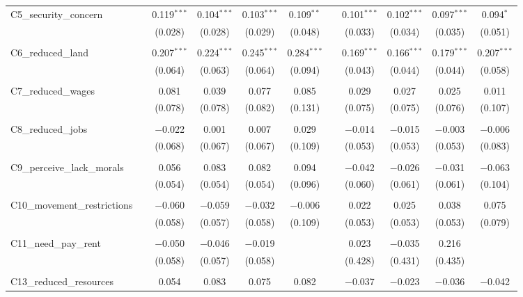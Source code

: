 \begin{table}[H]
\begin{tabular}{@{\extracolsep{4pt}}lcccccccccc}
 C5\_security\_concern &  & 0.119$^{***}$ & 0.104$^{***}$ & 0.103$^{***}$ & 0.109$^{**}$ &  & 0.101$^{***}$ & 0.102$^{***}$ & 0.097$^{***}$ & 0.094$^{*}$ \\ 
  &  & (0.028) & (0.028) & (0.029) & (0.048) &  & (0.033) & (0.034) & (0.035) & (0.051) \\ 
  & & & & & & & & & & \\ 
 C6\_reduced\_land &  & 0.207$^{***}$ & 0.224$^{***}$ & 0.245$^{***}$ & 0.284$^{***}$ &  & 0.169$^{***}$ & 0.166$^{***}$ & 0.179$^{***}$ & 0.207$^{***}$ \\ 
  &  & (0.064) & (0.063) & (0.064) & (0.094) &  & (0.043) & (0.044) & (0.044) & (0.058) \\ 
  & & & & & & & & & & \\ 
 C7\_reduced\_wages &  & 0.081 & 0.039 & 0.077 & 0.085 &  & 0.029 & 0.027 & 0.025 & 0.011 \\ 
  &  & (0.078) & (0.078) & (0.082) & (0.131) &  & (0.075) & (0.075) & (0.076) & (0.107) \\ 
  & & & & & & & & & & \\ 
 C8\_reduced\_jobs &  & $-$0.022 & 0.001 & 0.007 & 0.029 &  & $-$0.014 & $-$0.015 & $-$0.003 & $-$0.006 \\ 
  &  & (0.068) & (0.067) & (0.067) & (0.109) &  & (0.053) & (0.053) & (0.053) & (0.083) \\ 
  & & & & & & & & & & \\ 
 C9\_perceive\_lack\_morals &  & 0.056 & 0.083 & 0.082 & 0.094 &  & $-$0.042 & $-$0.026 & $-$0.031 & $-$0.063 \\ 
  &  & (0.054) & (0.054) & (0.054) & (0.096) &  & (0.060) & (0.061) & (0.061) & (0.104) \\ 
  & & & & & & & & & & \\ 
 C10\_movement\_restrictions &  & $-$0.060 & $-$0.059 & $-$0.032 & $-$0.006 &  & 0.022 & 0.025 & 0.038 & 0.075 \\ 
  &  & (0.058) & (0.057) & (0.058) & (0.109) &  & (0.053) & (0.053) & (0.053) & (0.079) \\ 
  & & & & & & & & & & \\ 
 C11\_need\_pay\_rent &  & $-$0.050 & $-$0.046 & $-$0.019 &  &  & 0.023 & $-$0.035 & 0.216 &  \\ 
  &  & (0.058) & (0.057) & (0.058) &  &  & (0.428) & (0.431) & (0.435) &  \\ 
  & & & & & & & & & & \\ 
 C13\_reduced\_resources &  & 0.054 & 0.083 & 0.075 & 0.082 &  & $-$0.037 & $-$0.023 & $-$0.036 & $-$0.042 \\ 

\end{tabular}
\end{table}
